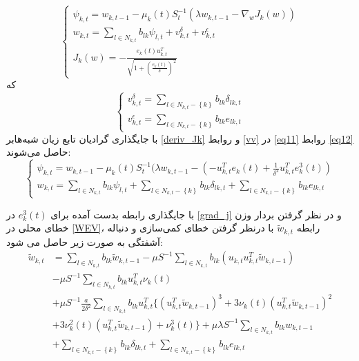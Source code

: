 \begin{equation}\label{eq11}
	\begin{cases}
		\psi_{k,t}=w_{k,t-1}-\mu_k(t) S_t^{-1}(\lambda w_{k,t-1}-\nabla_{w}{J_k(w)})\\
		w_{k,t}=\sum_{l\in N_{k,t}} b_{lk} \psi_{l,t}+v^{\delta}_{k,t}+v^{\epsilon}_{k,t}\\
		J_k(w)=-\frac{e_k(t)u_{k,t}^T}{\sqrt{1+(\frac{e_k(t)}{\delta})^2}}
	\end{cases}
\end{equation}
که 
\begin{equation}\label{vv}
	\begin{cases}
		v^{\delta}_{k,t}=\sum_{l\in N_{k,t}-\left\{k\right\}} b_{lk}\delta_{lk,t} \\
		v^{\epsilon}_{k,t}=\sum_{l\in N_{k,t}-\left\{k\right\}} b_{lk}e_{lk,t}
	\end{cases}
\end{equation}
با جایگذاری گرادیان تابع زیان شبه‌هابر \ref{deriv_Jk} و روابط \ref{vv} در \ref{eq11} روابط \ref{eq12} حاصل می‌شوند:
\begin{equation}\label{eq12}
	\begin{cases}
		\psi_{k,t}=w_{k,t-1}-\mu_k(t) S_t^{-1}(\lambda w_{k,t-1}-\left(-u_{k,t}^T e_k(t)+ \frac{1}{\delta^2}u_{k,t}^T e_k^3(t)\right)\\
		w_{k,t}=\sum_{l\in N_{k,t}} b_{lk} \psi_{l,t}+\sum_{l\in N_{k,t}-\left\{k\right\}} b_{lk}\delta_{lk,t}+\sum_{l\in N_{k,t}-\left\{k\right\}} b_{lk}e_{lk,t}
	\end{cases}
\end{equation}

با جایگذاری رابطه بدست آمده برای  $e^3_k(t)$ در \ref{grad_j} و در نظر گرفتن بردار وزن خطای محلی در \ref{WEV}، رابطه $\tilde{w}_{k,t}$ با درنظر گرفتن خطای کمی‌سازی و دنباله آشفتگی به صورت زیر حاصل می شود:
\begin{equation}\label{w_error_Q}
	\begin{split}
		\tilde{w}_{k,t}&=\sum_{l\in N_{k,t}}b_{lk} \tilde{w}_{k,t-1}-\mu S^{-1}\sum_{l\in N_{k,t}}b_{lk}(u_{k,t}u^T_{k,t}\tilde{w}_{k,t-1})\\
		&-\mu S^{-1} \sum_{l\in N_{k,t}}b_{lk} u^T_{k,t} \nu_k(t)\\
		&+\mu S^{-1}\frac{a}{2\delta^2}\sum_{l\in N_{k,t}}b_{lk}  u^T_{k,t}\{(u_{k,t}^T\tilde{w}_{k,t-1})^3+3\nu_k(t)(u_{k,t}^T\tilde{w}_{k,t-1})^2
		\\
		&+3\nu_k^2(t)(u_{k,t}^T\tilde{w}_{k,t-1})+\nu_k^3(t)\}+\mu \lambda S^{-1} \sum_{l\in N_{k,t}}b_{lk} w_{k,t-1}\\
		&+\sum_{l\in N_{k,t}-\left\{k\right\}}b_{lk}\delta_{lk,t}+\sum_{l\in N_{k,t}-\left\{k\right\}}b_{lk}e_{lk,t}
	\end{split}
\end{equation}


